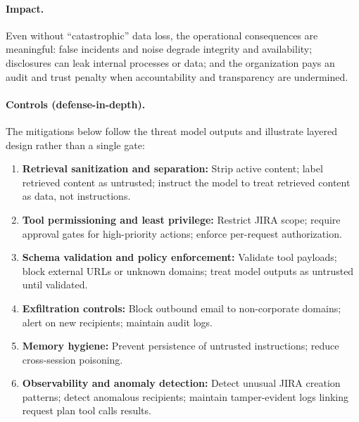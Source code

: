 \begin{TNtwocol}
  \paragraph{Impact.} Even without “catastrophic” data loss, the operational consequences are meaningful: false incidents and noise degrade integrity and availability; disclosures can leak internal processes or data; and the organization pays an audit and trust penalty when accountability and transparency are undermined. \cite{owasp-top10-llm-2025,nist-sp800-53b,nist-airmf-100-1}

  \paragraph{Controls (defense-in-depth).} The mitigations below follow the threat model outputs and illustrate layered design rather than a single gate:

  \begin{enumerate}
    \item \textbf{Retrieval sanitization and separation:} Strip active content; label retrieved content as untrusted; instruct the model to treat retrieved content as data, not instructions. \cite{owasp-prompt-injection-cheatsheet,owasp-top10-llm-2025}
    \item \textbf{Tool permissioning and least privilege:} Restrict JIRA scope; require approval gates for high-priority actions; enforce per-request authorization. \cite{nist-sp800-207,cisa-ztmm-v2}
    \item \textbf{Schema validation and policy enforcement:} Validate tool payloads; block external URLs or unknown domains; treat model outputs as untrusted until validated. \cite{owasp-top10-llm-2025,nist-sp800-53b}
    \item \textbf{Exfiltration controls:} Block outbound email to non-corporate domains; alert on new recipients; maintain audit logs. \cite{owasp-top10-llm-2025,nist-sp800-53b}
    \item \textbf{Memory hygiene:} Prevent persistence of untrusted instructions; reduce cross-session poisoning. \cite{owasp-prompt-injection-cheatsheet,nist-genai-600-1}
    \item \textbf{Observability and anomaly detection:} Detect unusual JIRA creation patterns; detect anomalous recipients; maintain tamper-evident logs linking request \rightarrow plan \rightarrow tool calls \rightarrow results. \cite{cisa-ztmm-v2,nist-sp800-53b}
  \end{enumerate}


\end{TNtwocol}
